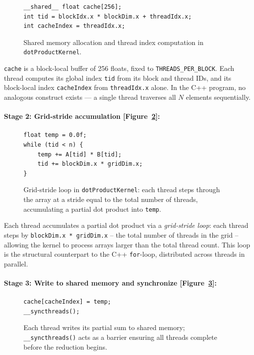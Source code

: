 \documentclass{article}
\begin{document}
\begin{figure}[H]
\begin{verbatim}
__shared__ float cache[256];
int tid = blockIdx.x * blockDim.x + threadIdx.x;
int cacheIndex = threadIdx.x;
\end{verbatim}
    \caption{Shared memory allocation and thread index computation in \texttt{dotProductKernel}.}
    \label{fig:cuda_thread_setup}
\end{figure}

\texttt{cache} is a block-local buffer of 256 floats, fixed to \texttt{THREADS\_PER\_BLOCK}. Each thread computes its global index \texttt{tid} from its block and thread IDs, and its block-local index \texttt{cacheIndex} from \texttt{threadIdx.x} alone. In the C++ program, no analogous construct exists --- a single thread traverses all $N$ elements sequentially.

\paragraph{Stage 2: Grid-stride accumulation [Figure~\ref{fig:cuda_grid_stride}]:}

\begin{figure}[H]
\begin{verbatim}
float temp = 0.0f;
while (tid < n) {
    temp += A[tid] * B[tid];
    tid += blockDim.x * gridDim.x;
}
\end{verbatim}
    \caption{Grid-stride loop in \texttt{dotProductKernel}: each thread steps through the array at a stride equal to the total number of threads, accumulating a partial dot product into \texttt{temp}.}
    \label{fig:cuda_grid_stride}
\end{figure}

Each thread accumulates a partial dot product via a \emph{grid-stride loop}: each thread steps by \texttt{blockDim.x * gridDim.x} -- the total number of threads in the grid -- allowing the kernel to process arrays larger than the total thread count. This loop is the structural counterpart to the C++ \texttt{for}-loop, distributed across threads in parallel.

\paragraph{Stage 3: Write to shared memory and synchronize [Figure~\ref{fig:cuda_sync}]:}

\begin{figure}[H]
\begin{verbatim}
cache[cacheIndex] = temp;
__syncthreads();
\end{verbatim}
    \caption{Each thread writes its partial sum to shared memory; \texttt{\_\_syncthreads()} acts as a barrier ensuring all threads complete before the reduction begins.}
    \label{fig:cuda_sync}
\end{figure}
\end{document}
